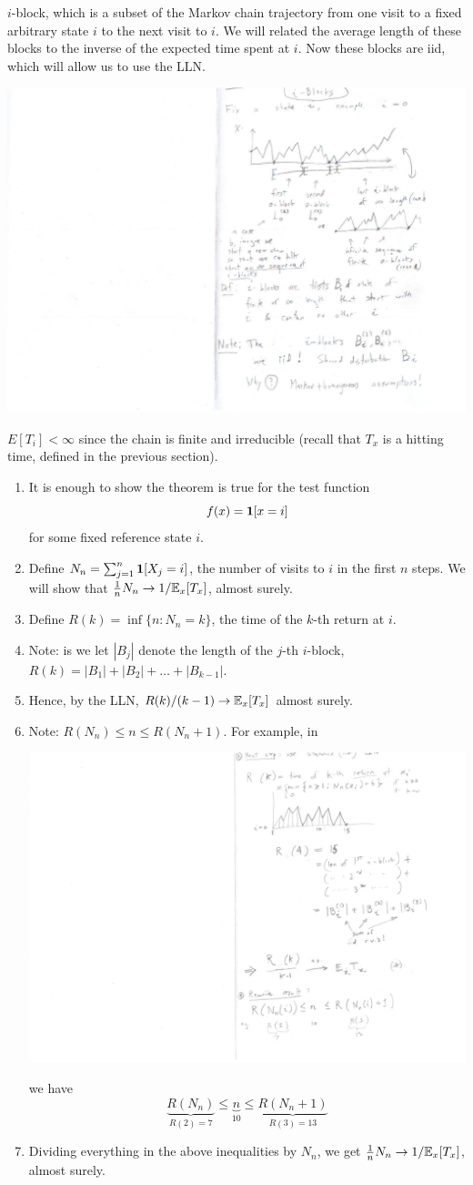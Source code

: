 \documentclass{article}
\begin{document}
 $i$-block, which is a subset of the Markov chain trajectory from one visit to a fixed arbitrary state $i$ to the next visit to $i$. We will related the average length of these blocks to the inverse of the expected time spent at $i$. Now these blocks are iid, which will allow us to use the LLN.
\begin{center}
	\includegraphics[width=0.6\linewidth]{figures/iblocks} 
\end{center}

 $E[T_i] < \infty$ since the chain is finite and irreducible (recall that $T_x$ is a hitting time, defined in the previous section).

\begin{enumerate}
  \item It is enough to show the theorem is true for the test function \[f(x) = {\mathbf 1}[x = i]\] for some fixed reference state $i$.
  \item Define $N_n = \sum_{j=1}^n {\mathbf 1}[X_j = i]$, the number of visits to $i$ in the first $n$ steps. We will show that $\frac{1}{n} N_n \to 1/{\mathbb E}_x [T_x]$, almost surely.
  \item Define $R(k) = \inf\{n:N_n = k\}$, the time of the $k$-th return at $i$.
  \item Note: is we let $|B_j|$ denote the length of the $j$-th $i$-block, $R(k) = |B_1| + |B_2| + \dots + |B_{k-1}|$.
  \item Hence, by the LLN, $R(k) / (k-1) \to {\mathbb E}_x [T_x]$ almost surely.
  \item Note: $R(N_n) \le n \le R(N_n + 1)$. For example, in 
  \begin{center}
  	\includegraphics[width=0.6\linewidth]{figures/i-block-eg} 
  \end{center}
  we have 
  \[
  \underbrace{R(N_n)}_{R(2) = 7} \le \underbrace{n}_{10} \le \underbrace{R(N_n + 1)}_{R(3) = 13}
  \]
  \item Dividing everything in the above inequalities by $N_n$, we get $\frac{1}{n} N_n \to 1/{\mathbb E}_x [T_x]$, almost surely.
\end{enumerate}
\end{document}

